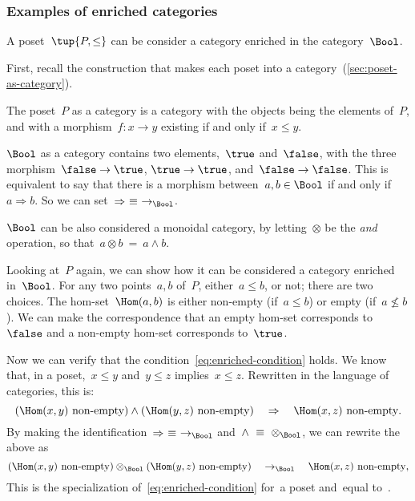 \subsubsection{Examples of enriched categories}
\begin{example}
    A poset~$\tup{P, \leq}$ can be consider a category enriched in the
    category~$\Bool$.

    First, recall the construction that makes each poset into a
    category~(\cref{sec:poset-as-category}).

    The poset~$P$ as a category is a category with the objects being the
    elements of~$P$, and with a morphism~$f: x \to y$ existing if and only if~$x
    \leq y$.

    $\Bool$ as a category contains two elements,~$\true$ and~$\false$, with
    the three morphism~$\false \to \true$, $\true \to \true$, and~$\false \to \false$. This is equivalent to say that there is a morphism between~$a, b \in \Bool$ if and only if~$a \Rightarrow b$. So we can set~$\Rightarrow\ \equiv\ \to_{\Bool}$.

    $\Bool$ can be also considered a monoidal category, by letting~$\otimes$ be
    the \emph{and} operation, so that~$a \otimes b\ =\ a \wedge b$.

    Looking at~$P$ again, we can show how it can be considered a category
    enriched in~$\Bool$. For any two points~$a, b$ of~$P$, either~$a \leq b$, or
    not; there are two choices. The hom-set~$\Hom(a, b)$ is either non-empty
    (if~$a \leq b$) or empty (if~$a \not\leq b$). We can make the correspondence
    that an empty hom-set corresponds to~$\false$ and a non-empty hom-set
    corresponds to~$\true$.

    Now we can verify that the condition~\eqref{eq:enriched-condition} holds. We
    know that, in a poset,~$x \leq y$ and~$y \leq z$ implies~$x \leq z$.
%
    Rewritten in the language of categories, this is:
    \begin{equation}
        (\Hom(x,y)\ \text{non-empty})
        \wedge
        (\Hom(y, z)\ \text{non-empty})
        \quad
        \Rightarrow
        \quad
        \Hom(x, z)\ \text{non-empty}.
    \end{equation}
    By making the identification~$\Rightarrow\ \equiv\ \to_{\Bool}$ and~$\wedge\ \equiv\ \otimes_{\Bool}$, we can rewrite the above as
    \begin{equation}
        (\Hom(x,y)\ \text{non-empty})
        \otimes_{\Bool}
        (\Hom(y, z)\ \text{non-empty})
        \quad
        \to_{\Bool}
        \quad
        \Hom(x, z)\ \text{non-empty},
    \end{equation}
    This is the specialization of~\eqref{eq:enriched-condition}
    for~\CatC a poset and~\CatD equal to~\Bool.
\end{example}

